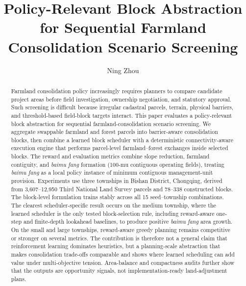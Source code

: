 \documentclass[preprint,12pt]{elsarticle}
\begin{document}
\begin{frontmatter}

\title{Policy-Relevant Block Abstraction for Sequential Farmland Consolidation Scenario Screening}

\author[pku,supermap]{Ning Zhou}


\begin{abstract}
Farmland consolidation policy increasingly requires planners to compare candidate project areas before field investigation, ownership negotiation, and statutory approval. Such screening is difficult because irregular cadastral parcels, terrain, physical barriers, and threshold-based field-block targets interact. This paper evaluates a policy-relevant block abstraction for sequential farmland-consolidation scenario screening. We aggregate swappable farmland and forest parcels into barrier-aware consolidation blocks, then combine a learned block scheduler with a deterministic connectivity-aware execution engine that performs parcel-level farmland--forest exchanges inside selected blocks. The reward and evaluation metrics combine slope reduction, farmland contiguity, and \textit{baimu fang} formation (100-mu contiguous operating fields), treating \textit{baimu fang} as a local policy instance of minimum contiguous management-unit provision. Experiments use three townships in Bishan District, Chongqing, derived from 3,607--12,950 Third National Land Survey parcels and 78--338 constructed blocks. The block-level formulation trains stably across all 15 seed--township combinations. The clearest scheduler-specific result occurs on the medium township, where the learned scheduler is the only tested block-selection rule, including reward-aware one-step and finite-depth lookahead baselines, to produce positive \textit{baimu fang} area growth. On the small and large townships, reward-aware greedy planning remains competitive or stronger on several metrics. The contribution is therefore not a general claim that reinforcement learning dominates heuristics, but a planning-scale abstraction that makes consolidation trade-offs comparable and shows where learned scheduling can add value under multi-objective tension. Area-balance and compactness audits further show that the outputs are opportunity signals, not implementation-ready land-adjustment plans.
\end{abstract}


\end{frontmatter}
\end{document}
